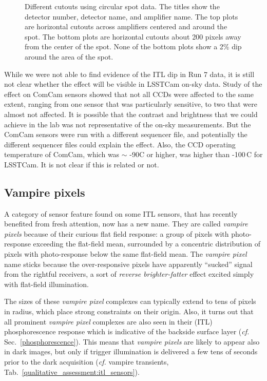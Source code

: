\begin{figure}[ht]
\caption{Different cutouts using circular spot data. The titles show the detector number, detector name, and amplifier name. The top plots are horizontal cutouts across amplifiers centered and around the spot. The bottom plots are horizontal cutouts about 200 pixels away from the center of the spot. None of the bottom plots show a 2\% dip around the area of the spot.}
\label{fig:ITLDip_Spots}
\end{figure}

While we were not able to find evidence of the ITL dip in Run 7 data, it
is still not clear whether the effect will be visible in LSSTCam on-sky data. 
Study of the effect on ComCam sensors showed that not all CCDs were affected to the same extent, ranging from one sensor that was particularly sensitive, to two that were almost not affected. 
It is possible that the contrast and brightness that we could achieve in the lab was not representative of the on-sky measurements. But the ComCam sensors were run with a different sequencer file, and potentially the different sequencer files could explain the effect. Also, the CCD operating temperature of ComCam, which was $\sim$ -90C or higher, was higher than -100\,C for  LSSTCam. It is not clear if this is related or not.

\clearpage

\subsection{Vampire pixels}\label{vampire-pixels}

A category of sensor feature found on some ITL sensors, that has recently benefited from fresh attention, now has a new name. They are called {\it vampire pixels} because of their curious flat field response: a group of pixels with photo-response exceeding the flat-field mean, surrounded by a concentric distribution of pixels with photo-response below the same flat-field mean. The {\it vampire pixel} name sticks because the over-responsive pixels have apparently ``sucked'' signal from the rightful receivers, a sort of {\it reverse brighter-fatter} effect excited simply with flat-field illumination. 

The sizes of these {\it vampire pixel} complexes can typically extend to tens of pixels in radius, which place strong constraints on their origin. Also, it turns out that all prominent {\it vampire pixel} complexes are also seen in their (ITL) phosphorescence response which is indicative of the backside surface layer ({\it cf.} Sec.~\ref{phosphorescence}). This means that {\it vampire pixels} are likely to appear also in dark images, but only if trigger illumination is delivered a few tens of seconds prior to the dark acquisition ({\it cf.} vampire transients, Tab.~\ref{qualitative_assessment:itl_sensors}).

